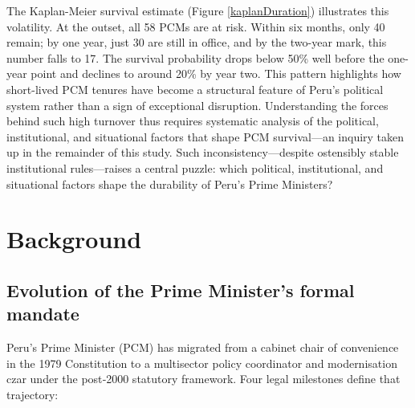\documentclass[a4paper, 12pt]{article}
\begin{document}
The Kaplan-Meier survival estimate (Figure \ref{kaplanDuration}) illustrates this volatility. At the outset, all 58 PCMs are at risk. Within six months, only 40 remain; by one year, just 30 are still in office, and by the two-year mark, this number falls to 17. The survival probability drops below 50\% well before the one-year point and declines to around 20\% by year two. This pattern highlights how short-lived PCM tenures have become a structural feature of Peru’s political system rather than a sign of exceptional disruption. Understanding the forces behind such high turnover thus requires systematic analysis of the political, institutional, and situational factors that shape PCM survival—an inquiry taken up in the remainder of this study. Such inconsistency—despite ostensibly stable institutional rules—raises a central puzzle: which political, institutional, and situational factors shape the durability of Peru’s Prime Ministers?



\section{Background}\label{backg-tables} %

\subsection{Evolution of the Prime Minister’s formal mandate} Peru’s Prime Minister (PCM) has migrated from a cabinet chair of convenience in the 1979 Constitution to a multisector policy coordinator and modernisation czar under the post‑2000 statutory framework.  Four legal milestones define that trajectory:
\end{document}

